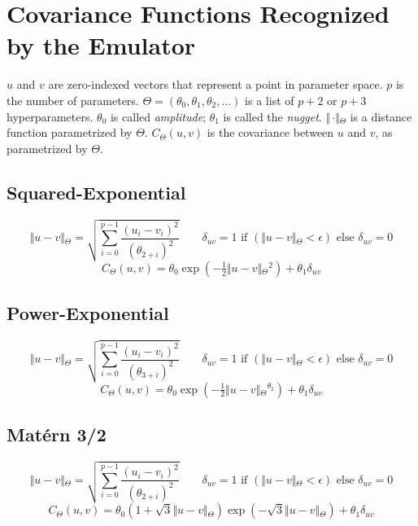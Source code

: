 
\section{Covariance Functions Recognized by the Emulator}
\label{CovarianceFunctions}

$u$ and $v$ are zero-indexed vectors that represent a point in parameter space.  $p$ is the number of parameters. $\Theta=(\theta_0, \theta_1,\theta_2,\ldots)$ is a list of $p+2$ or $p+3$ hyperparameters. $\theta_0$ is called \emph{amplitude}; $\theta_1$ is called the \emph{nugget}.  $\Vert\,\cdotp\Vert{}_\Theta$ is a distance function parametrized by $\Theta$.  $C_\Theta{}(u, v)$ is the covariance between $u$ and $v$, as parametrized by $\Theta$.  

\subsection*{Squared-Exponential}
\[ \Vert{}u-v\Vert{}_\Theta{} = \sqrt{\sum_{i=0}^{p-1} \frac{(u_i - v_i)^2}{(\theta{}_{2+i})^2}} \qquad
 \delta{}_{uv} = 1 \text{ if } (\Vert{}u-v\Vert{}_\Theta{} < \epsilon{}) \textrm{ else } \delta{}_{uv} = 0 \]
\[ C_\Theta{}(u, v) = \theta{}_0 \exp\left({-\tfrac{1}{2} \Vert{}u-v\Vert{}_\Theta{}^2}\right) + \theta{}_1\delta{}_{uv} \]

\subsection*{Power-Exponential}
\[ \Vert{}u-v\Vert{}_\Theta{} = \sqrt{\sum_{i=0}^{p-1} \frac{(u_i - v_i)^2}{(\theta{}_{3+i})^2}} \qquad
 \delta{}_{uv} = 1 \text{ if } (\Vert{}u-v\Vert{}_\Theta{} < \epsilon{}) \textrm{ else } \delta{}_{uv} = 0 \]
\[ C_\Theta{}(u, v) = \theta{}_0 \exp\left({-\tfrac{1}{2} \Vert{}u-v\Vert{}_\Theta{}^{\theta{}_2}}\right) + \theta{}_1\delta{}_{uv} \]

\subsection*{Mat\'{e}rn 3/2}
\[ \Vert{}u-v\Vert{}_\Theta{} = \sqrt{\sum_{i=0}^{p-1} \frac{(u_i - v_i)^2}{(\theta{}_{2+i})^2}} \qquad
 \delta{}_{uv} = 1 \text{ if } (\Vert{}u-v\Vert{}_\Theta{} < \epsilon{}) \textrm{ else } \delta{}_{uv} = 0 \]
\[ C_\Theta{}(u, v) = {\theta{}_0} \left({ 1 + \sqrt{3} \Vert{}u-v\Vert{}_\Theta{} }\right)
\exp \left({ - \sqrt{3} \Vert{}u-v\Vert{}_\Theta{} }\right) + \theta{}_1\delta{}_{uv} \]


